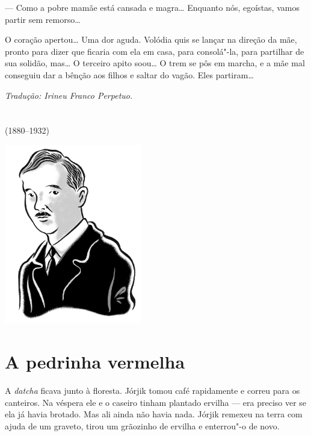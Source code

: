 --- Como a pobre mamãe está cansada e magra\ldots{} Enquanto nós, egoístas,
vamos partir sem remorso\ldots{}

O coração apertou\ldots{} Uma dor aguda. Volódia quis se lançar na direção da
mãe, pronto para dizer que ficaria com ela em casa, para consolá"-la,
para partilhar de sua solidão, mas\ldots{} O terceiro apito soou\ldots{} O trem se
pôs em marcha, e a mãe mal conseguiu dar a bênção aos filhos e saltar do
vagão. Eles partiram\ldots{}

\medskip

{\footnotesize\hfill\emph{Tradução: Irineu Franco Perpetuo.}}


\chapter*{}
\label{part14}
\thispagestyle{empty}

\begin{vplace}[1.5]
{\HUGES\hfill{}}

{\LARGE\hfill\textlt(1880–1932)}
\end{vplace}

\pagebreak
\thispagestyle{empty}
\mbox{}
\vfill
\begin{center}
\includegraphics[width=6cm]{./imgs/autor11.jpg}
\end{center}

\chapter{A pedrinha vermelha}

A \emph{datcha} ficava junto à floresta. Jórjik tomou café rapidamente e
correu para os canteiros. Na véspera ele e o caseiro tinham plantado
ervilha --- era preciso ver se ela já havia brotado. Mas ali ainda não
havia nada. Jórjik remexeu na terra com ajuda de um graveto, tirou um
grãozinho de ervilha e enterrou"-o de novo.

